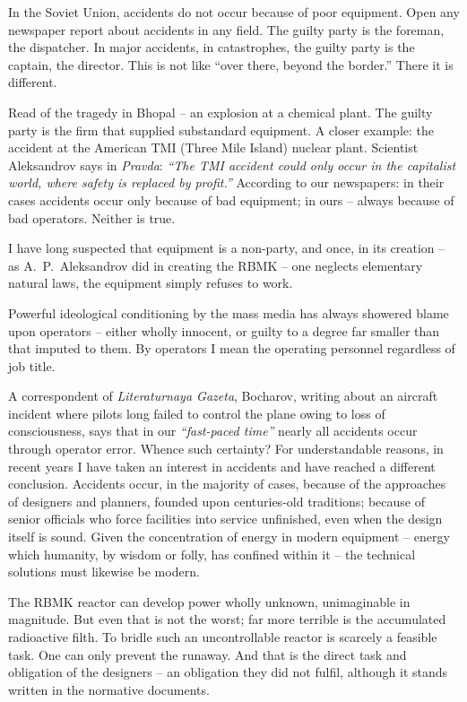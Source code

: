 \documentclass[openright]{bookest}
\begin{document}
In the Soviet Union, accidents do not occur because of poor equipment. Open any newspaper report about accidents in any field. The guilty party is the foreman, the dispatcher. In major accidents, in catastrophes, the guilty party is the captain, the director. This is not like ``over there, beyond the border.'' There it is different.

Read of the tragedy in Bhopal -- an explosion at a chemical plant. The guilty party is the firm that supplied substandard equipment. A closer example: the accident at the American TMI (Three Mile Island) nuclear plant. Scientist Aleksandrov says in \textit{Pravda}: \textit{``The TMI accident could only occur in the capitalist world, where safety is replaced by profit.''} According to our newspapers: in their cases accidents occur only because of bad equipment; in ours -- always because of bad operators. Neither is true.

I have long suspected that equipment is a non-party, and once, in its creation -- as A.~P.~Aleksandrov did in creating the RBMK -- one neglects elementary natural laws, the equipment simply refuses to work.

Powerful ideological conditioning by the mass media has always showered blame upon operators -- either wholly innocent, or guilty to a degree far smaller than that imputed to them. By operators I mean the operating personnel regardless of job title.

A correspondent of \textit{Literaturnaya Gazeta}, Bocharov, writing about an aircraft incident where pilots long failed to control the plane owing to loss of consciousness, says that in our \textit{``fast-paced time''} nearly all accidents occur through operator error. Whence such certainty? For understandable reasons, in recent years I have taken an interest in accidents and have reached a different conclusion. Accidents occur, in the majority of cases, because of the approaches of designers and planners, founded upon centuries-old traditions; because of senior officials who force facilities into service unfinished, even when the design itself is sound. Given the concentration of energy in modern equipment -- energy which humanity, by wisdom or folly, has confined within it -- the technical solutions must likewise be modern.

The RBMK reactor can develop power wholly unknown, unimaginable in magnitude. But even that is not the worst; far more terrible is the accumulated radioactive filth. To bridle such an uncontrollable reactor is scarcely a feasible task. One can only prevent the runaway. And that is the direct task and obligation of the designers -- an obligation they did not fulfil, although it stands written in the normative documents.
\end{document}

